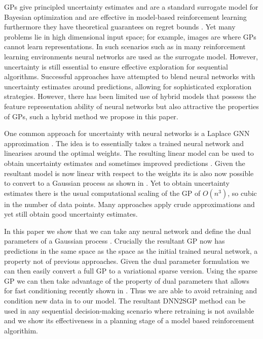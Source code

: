 \documentclass{article}
\begin{document}
GPs give principled uncertainty estimates and are a standard surrogate model for Bayesian optimization \citep{garnett_bayesoptbook_2022} and are effective in model-based reinforcement learning \citep{deisenroth2011pilco} furthermore they have theoretical guarantees on regret bounds \citep{srinivas2009gaussian}. Yet many problems lie in high dimensional input space; for example, images are where GPs cannot learn representations. In such scenarios such as in many reinforcement learning environments neural networks are used as the surrogate model. However, uncertainty is still essential to ensure effective exploration for sequential algorithms. Successful approaches have attempted to blend neural networks with uncertainty estimates around predictions, allowing for sophisticated exploration strategies. However, there has been limited use of hybrid models that possess the feature representation ability of neural networks but also attractive the properties of GPs, such a hybrid method we propose in this paper.

One common approach for uncertainty with neural networks is a Laplace GNN approximation \citep{daxbergerLaplace2021}. The idea is to essentially takes a trained neural network and linearises around the optimal weights. The resulting linear model can be used to obtain uncertainty estimates and sometimes improved predictions \citep{immerScalable2021}. Given the resultant model is now linear with respect to the weights its is also now possible to convert to a Gaussian process as shown in \citep{immerScalable2021, khan2019approximate}. Yet to obtain uncertainty estimates there is the usual computational scaling of the GP of $O(n^3)$, so cubic in the number of data points. Many approaches  apply crude approximations and yet still obtain good uncertainty estimates. 

In this paper we show that we can take any neural network and define the dual parameters of a Gaussian process \citep{csato2002sparse, adam2021dual, chang2020fast}. Crucially the resultant GP now has predictions in the same space as the space as the initial trained neural network, a property not of previous approaches. Given the dual parameter formulation we can then easily convert a full GP to a variational sparse version. Using the sparse GP we can then take advantage of the property of dual parameters that allows for fast conditioning recently shown in \citep{chang2022fantasizing}. Thus we are able to avoid retraining and condition new data in to our model. The resultant DNN2SGP method can be used in any sequential decision-making scenario where retraining is not available and we show its effectiveness in a planning stage of a model based reinforcement algorithim.
\end{document}
